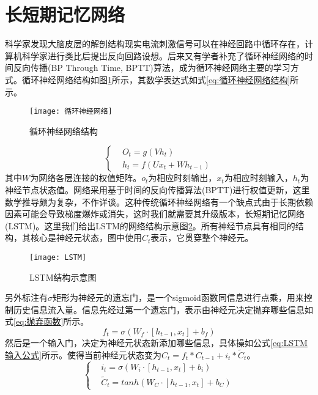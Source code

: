 \section{长短期记忆网络}
科学家发现大脑皮层的解剖结构现实电流刺激信号可以在神经回路中循环存在，计算机科学家进行类比后提出反向回路设想。后来又有学者补充了循环神经网络的时间反向传播(BP Through Time, BPTT)算法，成为循环神经网络主要的学习方式。循环神经网络结构如图\ref{fig:循环神经网络}所示，其数学表达式如式\ref{eq:循环神经网络结构}所示。
\begin{figure}[h]
	\centering
	\texttt{[image: 循环神经网络]}
	\caption{循环神经网络结构}
	\label{fig:循环神经网络}
\end{figure}
\begin{equation}\label{eq:循环神经网络结构}
\left\lbrace 
\begin{aligned}
&O_{t}=g\left ( Vh_{t} \right )\\
&h_{t}=f\left ( Ux_{t} + Wh_{t-1} \right )
\end{aligned}
\right.
\end{equation}
其中$W$为网络各层连接的权值矩阵。$o_{t}$为相应时刻输出，$x_{t}$为相应时刻输入，$h_{t}$为神经节点状态值。网络采用基于时间的反向传播算法(BPTT)进行权值更新，这里数学推导颇为复杂，不作详谈。这种传统循环神经网络有一个缺点式由于长期依赖因素可能会导致梯度爆炸或消失，这时我们就需要其升级版本，长短期记忆网络(LSTM)。这里我们给出LSTM的网络结构示意图\ref{fig:LSTM示意图}。所有神经节点具有相同的结构，其核心是神经元状态，图中使用$C_{t}$表示，它贯穿整个神经元。
\begin{figure}[h]
	\centering
	\texttt{[image: LSTM]}
	\caption{LSTM结构示意图}
	\label{fig:LSTM示意图}
\end{figure}
另外标注有$\sigma$矩形为神经元的遗忘门，是一个sigmoid函数同信息进行点乘，用来控制历史信息流入量。信息先经过第一个遗忘门，表示由神经元决定抛弃哪些信息如式\ref{eq:抛弃函数}所示。
\begin{equation}\label{eq:抛弃函数}
f_{t}=\sigma\left ( W_{f} \cdot \left [ h_{t-1},x_{t} \right ]+b_{f}\right )
\end{equation}
然后是一个输入门，决定为神经元状态新添加哪些信息，具体操如公式\ref{eq:LSTM输入公式}所示。使得当前神经元状态变为$C_{t}=f_{t}*C_{t-1}+i_{t}*\tilde{C}_{t}$。
\begin{equation}\label{eq:LSTM输入公式}
\left\lbrace 
\begin{aligned}
&i_{t}=\sigma \left ( W_{i} \cdot \left [ h_{t-1},x_{t} \right ] +b_{i}\right )\\
&\tilde{C}_{t}=tanh\left ( W_{C} \cdot \left [ h_{t-1},x_{t} \right ] +b_{C}\right )
\end{aligned}
\right.
\end{equation}
